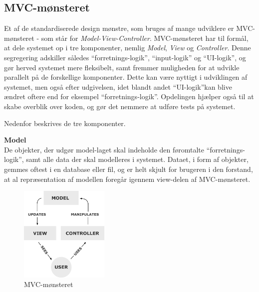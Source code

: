 \subsection{MVC-mønsteret}\label{MVC}

Et af de standardiserede design mønstre, som bruges af mange udviklere er MVC-mønsteret - som står for \textit{Model-View-Controller}.
MVC-mønsteret har til formål, at dele systemet op i tre komponenter, nemlig \textit{Model}, \textit{View} og \textit{Controller}.
Denne segregering adskiller således ``forretnings-logik'', ``input-logik'' og ``UI-logik'', og gør herved systemet mere fleksibelt, samt fremmer muligheden for at udvikle parallelt på de forskellige komponenter.
Dette kan være nyttigt i udviklingen af systemet, men også efter udgivelsen, idet blandt andet ``UI-logik''kan blive ændret oftere end for eksempel ``forretnings-logik''.
Opdelingen hjælper også til at skabe overblik over koden, og gør det nemmere at udføre tests på systemet. \citep{MVC_Overview}

Nedenfor beskrives de tre komponenter.

\textbf{Model}\\
De objekter, der udgør model-laget skal indeholde den føromtalte ``forretnings-logik'', samt alle data der skal modelleres i systemet.
Dataet, i form af objekter, gemmes oftest i en database eller fil, og er helt skjult for brugeren i den forstand, at al repræsentation af modellen foregår igennem view-delen af MVC-mønsteret.

\begin{figure}
	\vspace{0pt}
	\begin{center}
		\includegraphics[width=0.38\textwidth]{images/Images/mvc.png}
	\end{center}
	\vspace{-20pt}
	\caption{MVC-mønsteret}
	\vspace{-30pt}
\end{figure}

